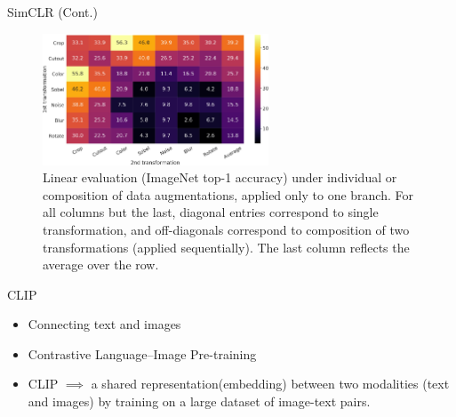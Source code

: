 \documentclass[serif, aspectratio=169]{beamer}
\begin{document}
\begin{frame}{SimCLR (Cont.)}
    \begin{figure}
        \setlength{\abovecaptionskip}{0pt}
        \setlength{\belowcaptionskip}{1pt}
        \centering
        \includegraphics[width=0.6\textwidth]{pic/simclr/7.png}
        \caption{Linear evaluation (ImageNet top-1 accuracy) under individual or composition of data augmentations, applied only to one branch. For all columns but the last, diagonal entries correspond to single transformation, and off-diagonals correspond to composition of two transformations (applied sequentially). The last column reflects the average over the row.}
   \end{figure}
\end{frame}


\begin{frame}{CLIP}
\begin{itemize}
\item Connecting text and images
\item Contrastive Language–Image Pre-training
\item CLIP $\implies$ a shared representation(embedding) between two modalities (text and images) by training on a large dataset of image-text pairs.
\end{itemize}
\end{frame}
\end{document}
